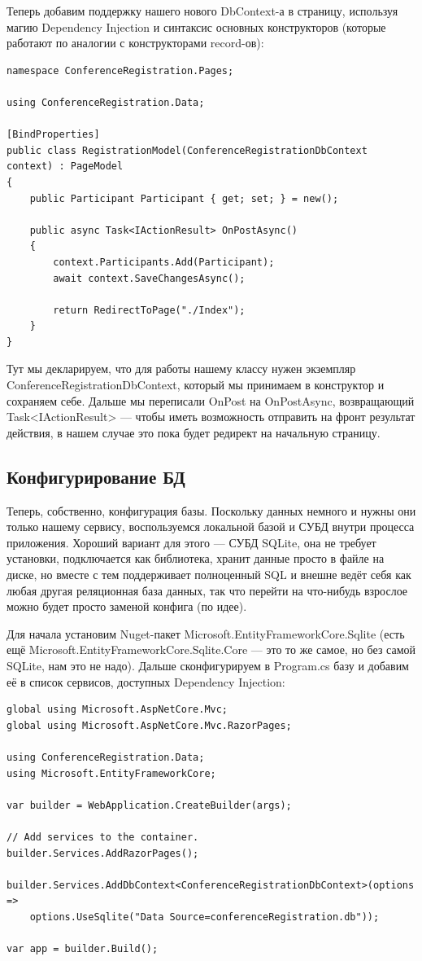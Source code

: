 \documentclass{../../text-style}
\begin{document}
Теперь добавим поддержку нашего нового DbContext-а в страницу, используя магию Dependency Injection и синтаксис основных конструкторов (которые работают по аналогии с конструкторами record-ов):

\begin{verbatim}
namespace ConferenceRegistration.Pages;

using ConferenceRegistration.Data;

[BindProperties]
public class RegistrationModel(ConferenceRegistrationDbContext context) : PageModel
{
    public Participant Participant { get; set; } = new();

    public async Task<IActionResult> OnPostAsync()
    {
        context.Participants.Add(Participant);
        await context.SaveChangesAsync();

        return RedirectToPage("./Index");
    }
}
\end{verbatim}

Тут мы декларируем, что для работы нашему классу нужен экземпляр ConferenceRegistrationDbContext, который мы принимаем в конструктор и сохраняем себе. Дальше мы переписали OnPost на OnPostAsync, возвращающий Task<IActionResult> --- чтобы иметь возможность отправить на фронт результат действия, в нашем случае это пока будет редирект на начальную страницу.

\subsection{Конфигурирование БД}

Теперь, собственно, конфигурация базы. Поскольку данных немного и нужны они только нашему сервису, воспользуемся локальной базой и СУБД внутри процесса приложения. Хороший вариант для этого --- СУБД SQLite, она не требует установки, подключается как библиотека, хранит данные просто в файле на диске, но вместе с тем поддерживает полноценный SQL и внешне ведёт себя как любая другая реляционная база данных, так что перейти на что-нибудь взрослое можно будет просто заменой конфига (по идее).

Для начала установим Nuget-пакет Microsoft.EntityFrameworkCore.Sqlite (есть ещё Microsoft.EntityFrameworkCore.Sqlite.Core --- это то же самое, но без самой SQLite, нам это не надо). Дальше сконфигурируем в Program.cs базу и добавим её в список сервисов, доступных Dependency Injection:

\begin{verbatim}
global using Microsoft.AspNetCore.Mvc;
global using Microsoft.AspNetCore.Mvc.RazorPages;

using ConferenceRegistration.Data;
using Microsoft.EntityFrameworkCore;

var builder = WebApplication.CreateBuilder(args);

// Add services to the container.
builder.Services.AddRazorPages();

builder.Services.AddDbContext<ConferenceRegistrationDbContext>(options =>
    options.UseSqlite("Data Source=conferenceRegistration.db"));

var app = builder.Build();
\end{verbatim}
\end{document}
